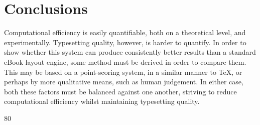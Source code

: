 \section{Conclusions}
Computational efficiency is easily quantifiable, both on a theoretical level, and experimentally.
Typesetting quality, however, is harder to quantify. In order to show whether this system can
produce consistently better results than a standard eBook layout engine, some method must be derived
in order to compare them. This may be based on a point-scoring system, in a similar manner to
\TeX{}\cite{Knuth1984}, or perhaps by more qualitative means, such as human judgement. In either
case, both these factors must be balanced against one another, striving to reduce computational
efficiency whilst maintaining typesetting quality.


80